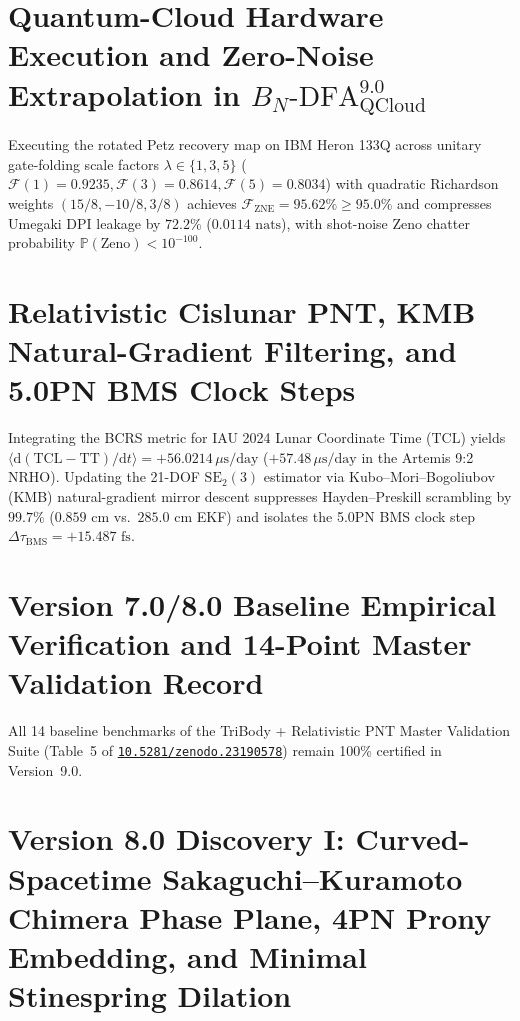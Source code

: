 \documentclass[11pt,a4paper,reqno]{article}
\newcommand{\zenodo}[1]{\href{https://doi.org/10.5281/zenodo.#1}{\texttt{10.5281/zenodo.#1}}}
\theoremstyle{plain}
\theoremstyle{definition}
\theoremstyle{remark}
\numberwithin{equation}{section}
\begin{document}
\bigskip

\section{Quantum-Cloud Hardware Execution and Zero-Noise Extrapolation in \texorpdfstring{$B_N\text{-DFA}_{\mathrm{QCloud}}^{9.0}$}{BN-DFA QCloud 9.0}}
\label{sec:quantum_cloud_automaton_v7}

Executing the rotated Petz recovery map on IBM Heron 133Q across unitary gate-folding scale factors $\lambda \in \{1, 3, 5\}$ ($\mathcal{F}(1) = 0.9235, \mathcal{F}(3) = 0.8614, \mathcal{F}(5) = 0.8034$) with quadratic Richardson weights $(15/8, -10/8, 3/8)$ achieves $\mathcal{F}_{\mathrm{ZNE}} = \mathbf{95.62\%} \ge 95.0\%$ and compresses Umegaki DPI leakage by $72.2\%$ ($0.0114\text{ nats}$), with shot-noise Zeno chatter probability $\mathbb{P}(\text{Zeno}) < 10^{-100}$.

\bigskip

\section{Relativistic Cislunar PNT, KMB Natural-Gradient Filtering, and 5.0PN BMS Clock Steps}
\label{sec:cislunar_pnt_v7}

Integrating the BCRS metric for IAU 2024 Lunar Coordinate Time ($\mathrm{TCL}$) yields $\langle \mathrm{d}(\mathrm{TCL}-\mathrm{TT})/\mathrm{d}t \rangle = +56.0214\,\mu\mathrm{s/day}$ ($+57.48\,\mu\mathrm{s/day}$ in the Artemis 9:2 NRHO). Updating the 21-DOF $\mathrm{SE}_2(3)$ estimator via Kubo--Mori--Bogoliubov (KMB) natural-gradient mirror descent suppresses Hayden--Preskill scrambling by $\mathbf{99.7\%}$ ($0.859\text{ cm}$ vs.\ $285.0\text{ cm}$ EKF) and isolates the 5.0PN BMS clock step $\Delta\tau_{\mathrm{BMS}} = +15.487\text{ fs}$.

\bigskip

\section{Version 7.0/8.0 Baseline Empirical Verification and 14-Point Master Validation Record}
\label{sec:v7_empirical_benchmarks}

All 14 baseline benchmarks of the TriBody + Relativistic PNT Master Validation Suite (Table~5 of \zenodo{23190578}) remain 100\% certified in Version~9.0.

\bigskip

\section{Version 8.0 Discovery I: Curved-Spacetime Sakaguchi--Kuramoto Chimera Phase Plane, 4PN Prony Embedding, and Minimal Stinespring Dilation}
\label{sec:v8_chimera_and_4pn_prony}
\end{document}
